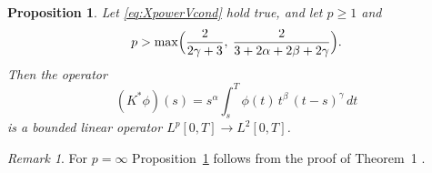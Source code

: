 \documentclass{article}
\theoremstyle{plain}
\newtheorem{prop}{Proposition}
\theoremstyle{remark}
\newtheorem{remark}{Remark}
\theoremstyle{definition}
\begin{document}
\begin{prop}
\label{prop:PW-L-cont}
Let \eqref{eq:XpowerVcond} hold true, and let
  $p\mathbin{\ge}1$ and
\begin{equation} \label{forseven} p>\max\Bigl( \frac{2}{2\gamma+3},\:\allowbreak
     \frac{2}{3+2\alpha+2\beta+2\gamma}\Bigr).\end{equation}
Then the operator
\[
	(K^* \phi)(s) = s^\alpha \int_s^T \phi(t)\, t^\beta \, (t-s)^\gamma\, dt
\]
is a bounded linear operator $L^p[0,T]\to L^2[0,T]$.
\end{prop}

\begin{remark}
	\label{remark:propPW-L-cont}
	For $p=\infty$  Proposition~\ref{prop:PW-L-cont} follows
	from the proof of Theorem~1 \cite{Part 1}.
\end{remark}
\end{document}
